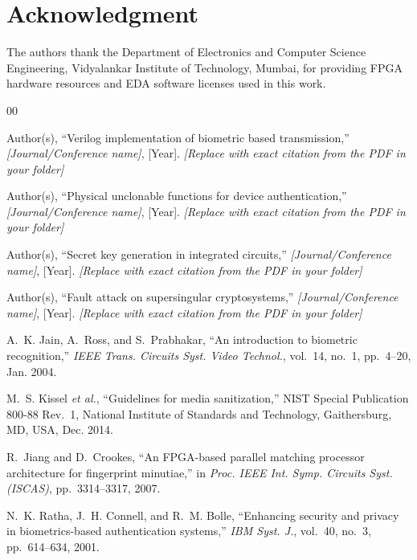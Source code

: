 \documentclass[conference]{IEEEtran}
\begin{document}
\section*{Acknowledgment}

The authors thank the Department of Electronics and Computer Science
Engineering, Vidyalankar Institute of Technology, Mumbai, for
providing FPGA hardware resources and EDA software licenses used
in this work.

\begin{thebibliography}{00}

Author(s),
``Verilog implementation of biometric based transmission,''
\textit{[Journal/Conference name]},
[Year].
\textit{[Replace with exact citation from the PDF in your folder]}

Author(s),
``Physical unclonable functions for device authentication,''
\textit{[Journal/Conference name]},
[Year].
\textit{[Replace with exact citation from the PDF in your folder]}

Author(s),
``Secret key generation in integrated circuits,''
\textit{[Journal/Conference name]},
[Year].
\textit{[Replace with exact citation from the PDF in your folder]}

Author(s),
``Fault attack on supersingular cryptosystems,''
\textit{[Journal/Conference name]},
[Year].
\textit{[Replace with exact citation from the PDF in your folder]}

A.~K. Jain, A.~Ross, and S.~Prabhakar,
``An introduction to biometric recognition,''
\textit{IEEE Trans. Circuits Syst. Video Technol.},
vol.~14, no.~1, pp.~4--20, Jan. 2004.

M.~S. Kissel \textit{et al.},
``Guidelines for media sanitization,''
NIST Special Publication 800-88 Rev.\ 1,
National Institute of Standards and Technology,
Gaithersburg, MD, USA, Dec. 2014.

R.~Jiang and D.~Crookes,
``An FPGA-based parallel matching processor architecture for fingerprint
minutiae,''
in \textit{Proc. IEEE Int. Symp. Circuits Syst. (ISCAS)},
pp.~3314--3317, 2007.

N.~K. Ratha, J.~H. Connell, and R.~M. Bolle,
``Enhancing security and privacy in biometrics-based authentication
systems,''
\textit{IBM Syst. J.}, vol.~40, no.~3, pp.~614--634, 2001.

\end{thebibliography}
\end{document}
